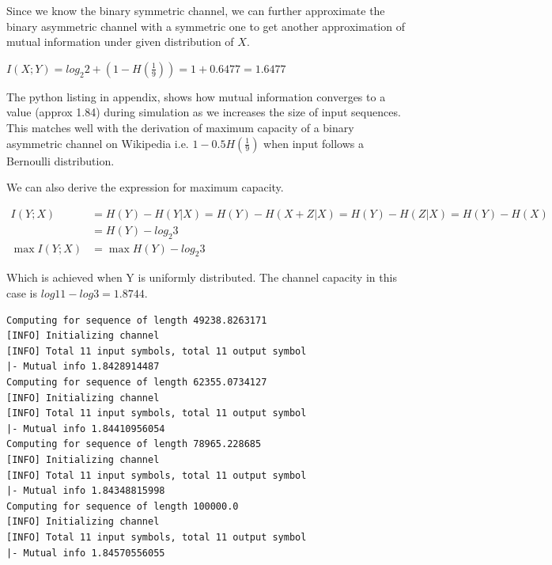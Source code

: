 \documentclass{article}
\begin{document}
Since we know the binary symmetric channel, we can further approximate the
binary asymmetric channel with a symmetric one to get another approximation of
mutual information under given distribution of $X$.

$ I(X; Y) = log_2 {2} + (1 - H(\frac{1}{9})) = 1 + 0.6477 = 1.6477 $

The python listing in appendix, shows how mutual information converges to a
value (approx 1.84) during simulation as we increases the size of input
sequences. This matches well with the derivation of maximum capacity of a binary
asymmetric channel on Wikipedia i.e. $1 - 0.5 H(\frac{1}{9})$ when input follows
a Bernoulli distribution.

We can also derive the expression for maximum capacity.

\begin{align}
I(Y;X) &= H(Y) - H(Y|X) = H(Y) - H(X+Z|X) = H(Y) - H(Z|X) = H(Y) - H(X) \\
    &= H(Y) - log_2 3 \\
\max I(Y; X) &= \max H(Y) - log_2 3
\end{align}

Which is achieved when Y is uniformly distributed. The channel capacity in this
case is $log 11 - log 3 = 1.8744$.



\begin{verbatim}
Computing for sequence of length 49238.8263171 
[INFO] Initializing channel
[INFO] Total 11 input symbols, total 11 output symbol
|- Mutual info 1.8428914487
Computing for sequence of length 62355.0734127 
[INFO] Initializing channel
[INFO] Total 11 input symbols, total 11 output symbol
|- Mutual info 1.84410956054
Computing for sequence of length 78965.228685 
[INFO] Initializing channel
[INFO] Total 11 input symbols, total 11 output symbol
|- Mutual info 1.84348815998
Computing for sequence of length 100000.0 
[INFO] Initializing channel
[INFO] Total 11 input symbols, total 11 output symbol
|- Mutual info 1.84570556055
\end{verbatim}
\end{document}
